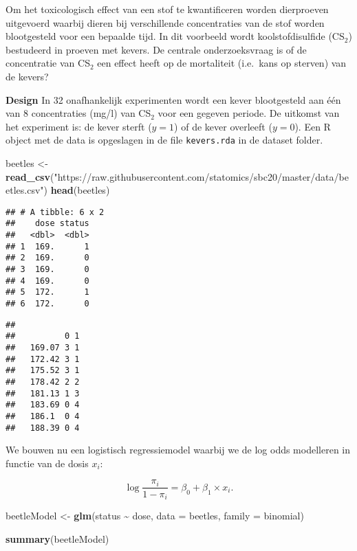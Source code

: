 \documentclass[
  12pt,dutch,coursenotes]{book}
\newenvironment{Shaded}{\begin{snugshade}}{\end{snugshade}}
\newcommand{\DataTypeTok}[1]{\textcolor[rgb]{0.13,0.29,0.53}{#1}}
\newcommand{\KeywordTok}[1]{\textcolor[rgb]{0.13,0.29,0.53}{\textbf{#1}}}
\newcommand{\NormalTok}[1]{#1}
\newcommand{\OperatorTok}[1]{\textcolor[rgb]{0.81,0.36,0.00}{\textbf{#1}}}
\newcommand{\StringTok}[1]{\textcolor[rgb]{0.31,0.60,0.02}{#1}}
\theoremstyle{definition}
\theoremstyle{definition}
\theoremstyle{definition}
\theoremstyle{remark}
\begin{document}
Om het toxicologisch effect van een stof te kwantificeren worden dierproeven uitgevoerd waarbij dieren bij verschillende concentraties van de stof worden blootgesteld voor een bepaalde tijd. In dit voorbeeld wordt koolstofdisulfide (CS\(_2\)) bestudeerd in proeven met kevers.
De centrale onderzoeksvraag is of de concentratie van CS\(_2\) een effect heeft op de mortaliteit (i.e.~kans op sterven) van de kevers?

\textbf{Design} In 32 onafhankelijk experimenten wordt een kever blootgesteld aan één van 8 concentraties (mg/l) van CS\(_2\) voor een gegeven periode. De uitkomst van het experiment is: de kever sterft (\(y=1\)) of de kever overleeft (\(y=0\)).
Een R object met de data is opgeslagen in de file \texttt{kevers.rda} in de dataset folder.

\begin{Shaded}
\begin{Highlighting}[]
\NormalTok{beetles \textless{}{-}}\StringTok{ }\KeywordTok{read\_csv}\NormalTok{(}\StringTok{"https://raw.githubusercontent.com/statomics/sbc20/master/data/beetles.csv"}\NormalTok{)}
\KeywordTok{head}\NormalTok{(beetles)}
\end{Highlighting}
\end{Shaded}

\begin{verbatim}
## # A tibble: 6 x 2
##    dose status
##   <dbl>  <dbl>
## 1  169.      1
## 2  169.      0
## 3  169.      0
## 4  169.      0
## 5  172.      1
## 6  172.      0
\end{verbatim}

\begin{Shaded}
\end{Shaded}

\begin{verbatim}
##         
##          0 1
##   169.07 3 1
##   172.42 3 1
##   175.52 3 1
##   178.42 2 2
##   181.13 1 3
##   183.69 0 4
##   186.1  0 4
##   188.39 0 4
\end{verbatim}

We bouwen nu een logistisch regressiemodel waarbij we de log odds modelleren in functie van de dosis \(x_i\):

\[\log \frac{\pi_i}{1-\pi_i}=\beta_0+\beta_1 \times x_i.\]

\begin{Shaded}
\begin{Highlighting}[]
\NormalTok{beetleModel \textless{}{-}}\StringTok{ }\KeywordTok{glm}\NormalTok{(status }\OperatorTok{\textasciitilde{}}\StringTok{ }\NormalTok{dose, }\DataTypeTok{data =}\NormalTok{ beetles, }\DataTypeTok{family =}\NormalTok{ binomial)}

\KeywordTok{summary}\NormalTok{(beetleModel)}
\end{Highlighting}
\end{Shaded}
\end{document}
